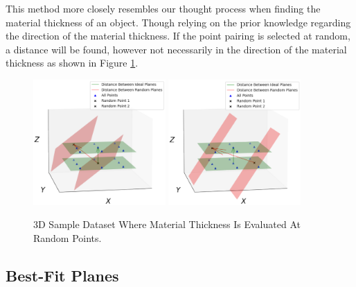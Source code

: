 \documentclass[%
]{USN-MSc}
\begin{document}
This method more closely resembles our thought process when finding the material thickness of an object. Though relying on the prior knowledge regarding the direction of the material thickness. If the point pairing is selected at random, a distance will be found, however not necessarily in the direction of the material thickness as shown in Figure \ref{fig:Sample Data-set Evaluated at Random Points}.

\begin{figure}[H]
  \centering
  \includegraphics[width=0.45\textwidth]{fig/Sample Data-Set Random Points 1.png}
  \includegraphics[width=0.45\textwidth]{fig/Sample Data-Set Random Points 2.png}
  \caption{3D Sample Dataset Where Material Thickness Is Evaluated At Random Points.}
  \label{fig:Sample Data-set Evaluated at Random Points}
\end{figure}

\subsection{Best-Fit Planes}
\end{document}
